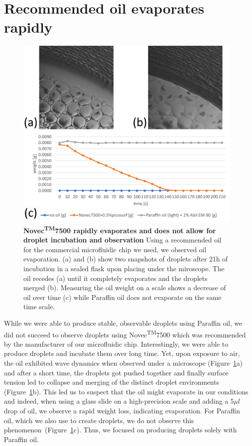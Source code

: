\section{Recommended oil evaporates rapidly}
\begin{figure}
\centering
\includegraphics[width=\linewidth]{graphics/2025_09_30_droplets_fig6.png}
\caption{\textbf{Novec\textsuperscript{TM}7500 rapidly evaporates and does not allow for droplet incubation and observation} Using a recommended oil for the commercial microfluidic chip we used, we observed oil evaporation. (a) and (b) show two snapshots of droplets after 21h of incubation in a sealed flask upon placing under the miroscope. The oil recedes (a) until it completely evaporates and the droplets merged (b). Measuring the oil weight on a scale shows a decrease of oil over time (c) while Paraffin oil does not evaporate on the same time scale.}
\label{fig:results_oil_evaporation}
\end{figure}
While we were able to produce stable, observable droplets using Paraffin oil, we did not succeed to observe droplets using Novec\textsuperscript{TM}7500 which was recommended by the manufacturer of our microfluidic chip. Interestingly, we were able to produce droplets and incubate them over long time. Yet, upon exposure to air, the oil exhibited wave dynamics when observed under a microscope (Figure~\ref{fig:results_oil_evaporation}a) and after a short time, the droplets got pushed together and finally surface tension led to collapse and merging of the distinct droplet environments (Figure~\ref{fig:results_oil_evaporation}b). This led us to suspect that the oil might evaporate in our conditions and indeed, when using a glass slide on a high-precision scale and adding a $5 \mu l$ drop of oil, we observe a rapid weight loss, indicating evaporation. For Paraffin oil, which we also use to create droplets, we do not observe this phenomenon~(Figure~\ref{fig:results_oil_evaporation}c). Thus, we focused on producing droplets solely with Paraffin oil.

